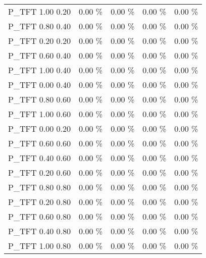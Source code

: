 \begin{tabular}{|l|r|r|r|r|}
P\_TFT 1.00 0.20              &    0.00 \%  &    0.00 \%  &    0.00 \%  &    0.00 \% \\
P\_TFT 0.80 0.40              &    0.00 \%  &    0.00 \%  &    0.00 \%  &    0.00 \% \\
P\_TFT 0.20 0.20              &    0.00 \%  &    0.00 \%  &    0.00 \%  &    0.00 \% \\
P\_TFT 0.60 0.40              &    0.00 \%  &    0.00 \%  &    0.00 \%  &    0.00 \% \\
P\_TFT 1.00 0.40              &    0.00 \%  &    0.00 \%  &    0.00 \%  &    0.00 \% \\
P\_TFT 0.00 0.40              &    0.00 \%  &    0.00 \%  &    0.00 \%  &    0.00 \% \\
P\_TFT 0.80 0.60              &    0.00 \%  &    0.00 \%  &    0.00 \%  &    0.00 \% \\
P\_TFT 1.00 0.60              &    0.00 \%  &    0.00 \%  &    0.00 \%  &    0.00 \% \\
P\_TFT 0.00 0.20              &    0.00 \%  &    0.00 \%  &    0.00 \%  &    0.00 \% \\
P\_TFT 0.60 0.60              &    0.00 \%  &    0.00 \%  &    0.00 \%  &    0.00 \% \\
P\_TFT 0.40 0.60              &    0.00 \%  &    0.00 \%  &    0.00 \%  &    0.00 \% \\
P\_TFT 0.20 0.60              &    0.00 \%  &    0.00 \%  &    0.00 \%  &    0.00 \% \\
P\_TFT 0.80 0.80              &    0.00 \%  &    0.00 \%  &    0.00 \%  &    0.00 \% \\
P\_TFT 0.20 0.80              &    0.00 \%  &    0.00 \%  &    0.00 \%  &    0.00 \% \\
P\_TFT 0.60 0.80              &    0.00 \%  &    0.00 \%  &    0.00 \%  &    0.00 \% \\
P\_TFT 0.40 0.80              &    0.00 \%  &    0.00 \%  &    0.00 \%  &    0.00 \% \\
P\_TFT 1.00 0.80              &    0.00 \%  &    0.00 \%  &    0.00 \%  &    0.00 \% \\
\hline
\end{tabular}
